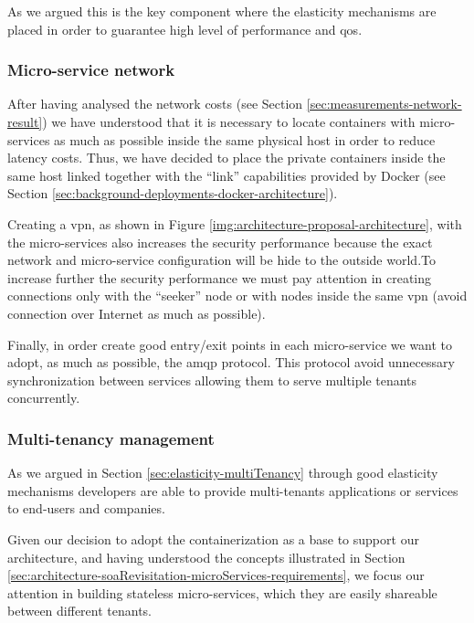 As we argued this is the key component where the elasticity mechanisms are placed in order to guarantee
high level of performance and \ac{qos}.

\subsubsection{Micro-service network}
\label{sec:architecture-propoasal-architecture-network}
After having analysed the network costs (see Section \ref{sec:measurements-network-result}) we have
understood that it is necessary to locate containers with micro-services as much as possible inside 
the same physical host in order to reduce latency costs. Thus, we have decided to place the private
containers inside the same host linked together with the ``link'' capabilities provided by Docker
(see Section \ref{sec:background-deployments-docker-architecture}).

Creating a \ac{vpn}, as shown in Figure \ref{img:architecture-proposal-architecture}, with the
micro-services also increases the security performance because the exact network and micro-service
configuration will be hide to the outside world.To increase further the security performance we must
pay attention in creating connections only with the ``seeker'' node  or with nodes inside the same
\ac{vpn} (avoid connection over Internet as much as possible).

Finally, in order create good entry/exit points in each micro-service we want to adopt, as much as possible,
the \ac{amqp} protocol. This protocol avoid unnecessary synchronization between services allowing them
to serve multiple tenants concurrently.

\subsubsection{Multi-tenancy management}
\label{sec:architecture-propoasal-architecture-multiTenancy}
As we argued in Section \ref{sec:elasticity-multiTenancy} through good elasticity mechanisms developers
are able to provide multi-tenants applications or services to end-users and companies.

Given our decision to adopt the containerization as a base to support our architecture, and having 
understood the concepts illustrated in Section \ref{sec:architecture-soaRevisitation-microServices-requirements},
we focus our attention in building stateless micro-services, which they are easily shareable between
different tenants.

